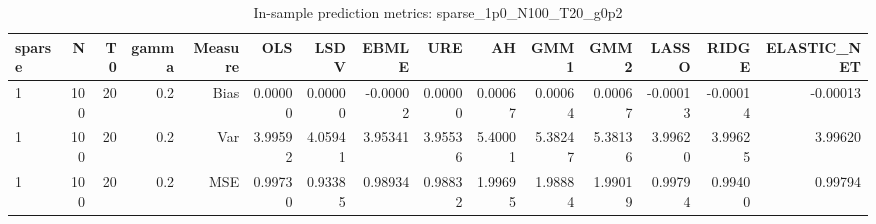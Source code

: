 \begin{table}[!htbp]\centering
\caption{In-sample prediction metrics: sparse_1p0_N100_T20_g0p2}
\label{tab:table2_sparse_1p0_N100_T20_g0p2}
\begin{tabular}{lrrrrrrrrrrrrrr}
\hline
sparse & N & T0 & gamma & Measure & OLS & LSDV & EBMLE & URE & AH & GMM1 & GMM2 & LASSO & RIDGE & ELASTIC_NET \\
\hline
1 & 100 & 20 & 0.2 & Bias & 0.00000 & 0.00000 & -0.00002 & 0.00000 & 0.00067 & 0.00064 & 0.00067 & -0.00013 & -0.00014 & -0.00013 \\
1 & 100 & 20 & 0.2 & Var & 3.99592 & 4.05941 & 3.95341 & 3.95536 & 5.40001 & 5.38247 & 5.38136 & 3.99620 & 3.99625 & 3.99620 \\
1 & 100 & 20 & 0.2 & MSE & 0.99730 & 0.93385 & 0.98934 & 0.98832 & 1.99695 & 1.98884 & 1.99019 & 0.99794 & 0.99400 & 0.99794 \\
\hline
\end{tabular}
\end{table}

